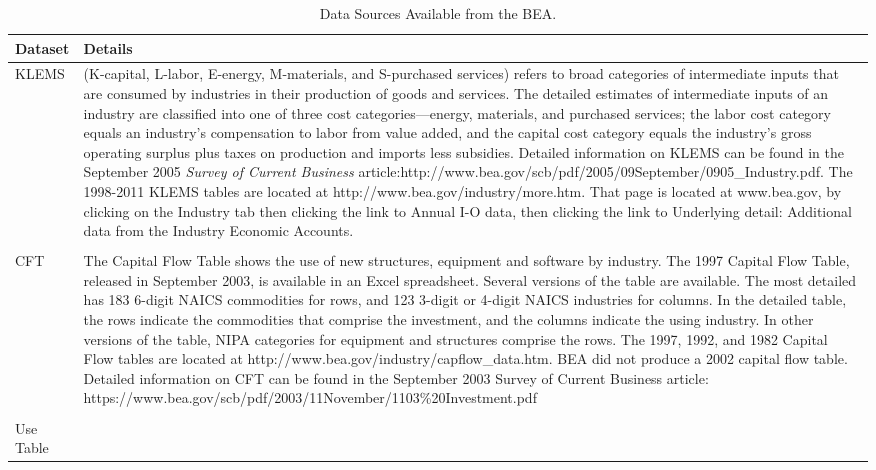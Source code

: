 \begin{table}
\caption[Data Sources Available from the BEA]{Data Sources Available from the BEA.}
\begin{center}
  \begin{tabular}{l @{\hspace{2em}} p{10cm}}
   \toprule 
    Dataset & Details  \\ 

	\midrule
KLEMS &
(K-capital, L-labor, E-energy, M-materials, and S-purchased services) refers to broad categories of intermediate inputs that are consumed by industries in their production of goods and services.  The detailed estimates of intermediate inputs of an industry are classified into one of three cost categories—energy, materials, and purchased services; the labor cost category equals an industry’s compensation to labor from value added, and the capital cost category equals the industry’s gross operating surplus plus taxes on production and imports less subsidies.  Detailed information on KLEMS can be found in the September 2005 \emph{ Survey of Current Business} article:http://www.bea.gov/scb/pdf/2005/09September/0905\_Industry.pdf. The 1998-2011 KLEMS tables are located at 
 http://www.bea.gov/industry/more.htm. That page is located at  www.bea.gov, by clicking on the Industry tab then clicking the link to Annual I-O data, then clicking the link to Underlying detail: Additional data from the Industry Economic Accounts. \\
 & \\
CFT & 
The Capital Flow Table shows the use of new structures, equipment and software by industry. The 1997 Capital Flow Table, released in September 2003, is available in an Excel spreadsheet. Several versions of the table are available. The most detailed has 183 6-digit NAICS commodities for rows, and 123 3-digit or 4-digit NAICS industries for columns. In the detailed table, the rows indicate the commodities that comprise the investment, and the columns indicate the using industry. In other versions of the table, NIPA categories for equipment and structures comprise the rows. The 1997, 1992, and 1982 Capital Flow tables are located at http://www.bea.gov/industry/capflow\_data.htm.  BEA did not produce a 2002 capital flow table. Detailed information on CFT can be found in the September 2003 Survey of Current Business article:
https://www.bea.gov/scb/pdf/2003/11November/1103\%20Investment.pdf\\
 & \\
Use Table & 

\end{tabular}
\end{center}
\end{table}
